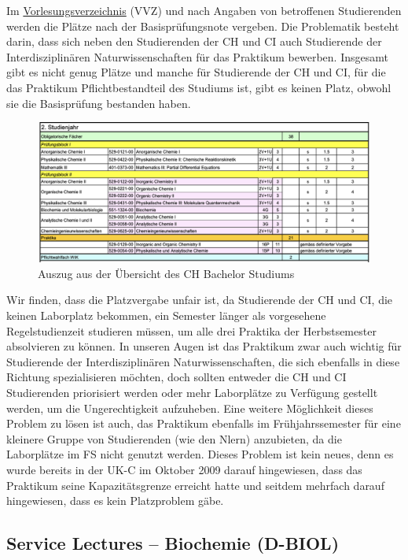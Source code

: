 \documentclass{article}
\begin{document}
Im \href{https://www.vvz.ethz.ch/Vorlesungsverzeichnis/lerneinheit.view?semkez=2024W&ansicht=ALLE&lerneinheitId=182740&lang=de}{Vorlesungsverzeichnis} (VVZ) und nach Angaben von betroffenen Studierenden werden die Plätze nach der Basisprüfungsnote vergeben. Die Problematik besteht darin, dass sich neben den Studierenden der CH und CI auch Studierende der Interdisziplinären Naturwissenschaften für das Praktikum bewerben. Insgesamt gibt es nicht genug Plätze und manche für Studierende der CH und CI, für die das Praktikum Pflichtbestandteil des Studiums ist, gibt es keinen Platz, obwohl sie die Basisprüfung bestanden haben.

\begin{figure}[H]
    \centering
    \includegraphics[width=0.9\linewidth]{Graphics/Screenshot 2025-03-11 at 16.23.07.png}
    \caption{Auszug aus der Übersicht des CH Bachelor Studiums}
    \label{fig:enter-label}
\end{figure}

Wir finden, dass die Platzvergabe unfair ist, da Studierende der CH und CI, die keinen Laborplatz bekommen, ein Semester länger als vorgesehene Regelstudienzeit studieren müssen, um alle drei Praktika der Herbstsemester absolvieren zu können. In unseren Augen ist das Praktikum zwar auch wichtig für Studierende der Interdisziplinären Naturwissenschaften, die sich ebenfalls in diese Richtung spezialisieren möchten, doch sollten entweder die CH und CI Studierenden priorisiert werden oder mehr Laborplätze zu Verfügung gestellt werden, um die Ungerechtigkeit aufzuheben. Eine weitere Möglichkeit dieses Problem zu lösen ist auch, das Praktikum ebenfalls im Frühjahrssemester für eine kleinere Gruppe von Studierenden (wie den Nlern) anzubieten, da die Laborplätze im FS nicht genutzt werden. Dieses Problem ist kein neues, denn es wurde bereits in der UK-C im Oktober 2009 darauf hingewiesen, dass das Praktikum seine Kapazitätsgrenze erreicht hatte und seitdem mehrfach darauf hingewiesen, dass es kein Platzproblem gäbe.

\subsection{Service Lectures – Biochemie (D-BIOL)}
\end{document}
